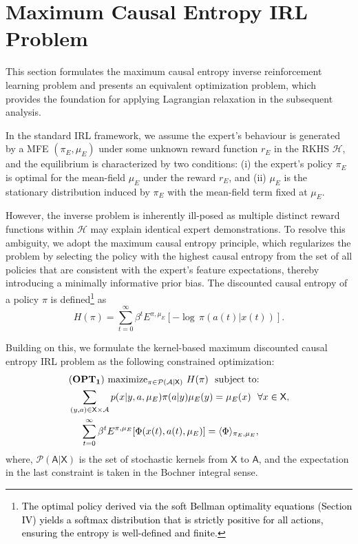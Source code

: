 \documentclass[11pt]{article}
\newcommand{\sX}{{\mathsf X}}
\newcommand{\sA}{{\mathsf A}}
\newcommand{\cH}{{\mathcal H}}
\newcommand{\Pnew}{{\mathcal P}}
\newcommand{\tb}[1]{\textcolor{black}{#1}} %
\begin{document}
\section{Maximum Causal Entropy IRL Problem}

This section formulates the maximum causal entropy inverse reinforcement learning problem and presents an equivalent optimization problem, which provides the foundation for applying Lagrangian relaxation in the subsequent analysis.


In the standard IRL framework, we assume the expert's behaviour is generated by a MFE $(\pi_E,\mu_E)$ under some unknown reward function $r_E$ in the RKHS $\cH$, and the equilibrium is characterized by two conditions: (i) the expert's policy $\pi_E$ is optimal for the mean-field $\mu_E$ under the reward $r_E$, and (ii) $\mu_E$ is the stationary distribution induced by $\pi_E$ with the mean-field term fixed at $\mu_E$. 

However, the inverse problem is inherently ill-posed as multiple distinct reward functions within $\cH$ may explain identical expert demonstrations. To resolve this ambiguity, we adopt the maximum causal entropy principle, which regularizes the problem by selecting the policy with the highest causal entropy from the set of all policies that are consistent with the expert's feature expectations, thereby introducing a minimally informative prior bias. The discounted causal entropy of a policy $\pi$ is defined\footnote{\tb{ The optimal policy derived via the soft Bellman optimality equations (Section IV) yields a softmax distribution that is strictly positive for all actions, ensuring the entropy is well-defined and finite.}
} as
$$
H(\pi) = \sum_{t=0}^{\infty} \beta^t E^{\pi,\mu_E} \left[-\log \, \pi(a(t)|x(t)) \right].
$$


Building on this, we formulate the kernel-based maximum discounted causal entropy IRL problem as the following constrained optimization:
\begin{align*}
&\mathbf{(OPT_1)} \ \text{maximize}_{\pi \in \mathcal{P}(\mathcal{A}|\sX)} \ H(\pi) ~~ \text{subject to:} \\
&\sum_{(y,a) \in \sX \times \mathcal{A}} p(x|y,a,\mu_E) \pi(a|y) \mu_E(y) = \mu_E(x) ~~ \forall x \in \sX, \\
&\hspace{1.25em}\sum_{t=0}^{\infty} \beta^t E^{\pi,\mu_E}[\Phi(x(t),a(t),\mu_E)] = \langle \Phi \rangle_{\pi_E,\mu_E},
\end{align*}
where, $\Pnew(\sA|\sX)$ is the set of stochastic kernels from $\sX$ to $\sA$, and the expectation in the last constraint is taken in the Bochner integral sense. 
\end{document}
